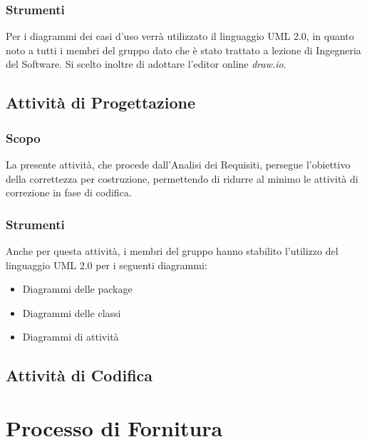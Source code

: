 			
			\subsubsection{Strumenti}
				Per i diagrammi dei casi d'uso verrà utilizzato il linguaggio UML 2.0,
				in quanto noto a tutti i membri del gruppo dato che è stato trattato a lezione
				di Ingegneria del Software.
				Si scelto inoltre di adottare l'editor online \emph{draw.io}.
			
			
		\subsection{Attività di Progettazione}
			\subsubsection{Scopo}
		     La presente attività, che procede dall'Analisi dei Requisiti, persegue l'obiettivo
		     della correttezza per costruzione, permettendo di ridurre al minimo le attività di correzione
		     in fase di codifica.
		
		 
		
		 
		 \subsubsection{Strumenti}
		 Anche per questa attività, i membri del gruppo hanno stabilito l'utilizzo del linguaggio UML 2.0 per i seguenti
		 diagrammi:
		 \begin{itemize}
			\item Diagrammi delle package  
			\item Diagrammi delle classi	
			\item Diagrammi di attività
		\end{itemize}
			 
		
		\subsection{Attività di Codifica}
		
	\section{Processo di Fornitura}
